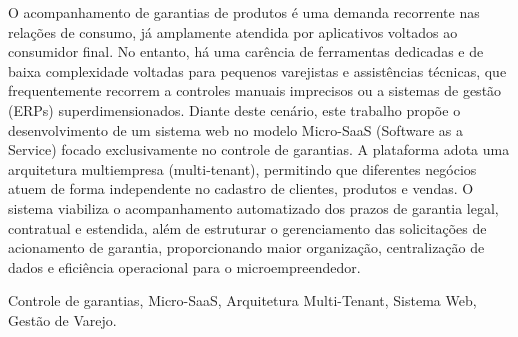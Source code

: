 O acompanhamento de garantias de produtos é uma demanda recorrente nas relações de consumo, já amplamente atendida por aplicativos voltados ao consumidor final. No entanto, há uma carência de ferramentas dedicadas e de baixa complexidade voltadas para pequenos varejistas e assistências técnicas, que frequentemente recorrem a controles manuais imprecisos ou a sistemas de gestão (ERPs) superdimensionados. Diante deste cenário, este trabalho propõe o desenvolvimento de um sistema web no modelo Micro-SaaS (Software as a Service) focado exclusivamente no controle de garantias. A plataforma adota uma arquitetura multiempresa (multi-tenant), permitindo que diferentes negócios atuem de forma independente no cadastro de clientes, produtos e vendas. O sistema viabiliza o acompanhamento automatizado dos prazos de garantia legal, contratual e estendida, além de estruturar o gerenciamento das solicitações de acionamento de garantia, proporcionando maior organização, centralização de dados e eficiência operacional para o microempreendedor.

\begin{keywords}
Controle de garantias, Micro-SaaS, Arquitetura Multi-Tenant, Sistema Web, Gestão de Varejo.
\end{keywords}